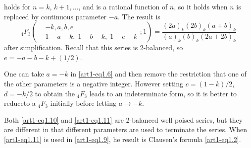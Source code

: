 holds for $n = k$, $k+1, \ldots$, and is a rational function of $n$, so it holds when $n$ is replaced by continuous parameter $-a$. The result is 
\begin{equation}
{}_4 F_3 \left(\begin{aligned}& -k, a, b, e \\ & 1 - a - k, \; 1 -b-k, \; 1 - e -k
\end{aligned}; 1\right)= \frac{(2a)_k (2b)_k (a+b)_k}{(a)_k (b)_k (2a+2b)_k} \label{art1-eq1.11}
\end{equation}
after simplification. Recall that this series is 2-balanced, so $e = -a -b -k + (1/2)$.

One can take $a= -k$ in \eqref{art1-eq1.6} and then remove the restriction that one of the other parameters is a negative integer. However setting $c = (1-k)/2$, $d = -k/2$ to obtain the ${}_4 F_3$ leads to an indeterminate form, so it is better to reduce\pageoriginale to a ${}_4 F_3$ initially before letting $a \to -k$.

Both \eqref{art1-eq1.10} and \eqref{art1-eq1.11} are 2-balanced well poised series, but they are different in that different parameters are used to terminate the series. When \eqref{art1-eq1.11} is used in \eqref{art1-eq1.9}, he result is Clausen's formula \eqref{art1-eq1.2}.

